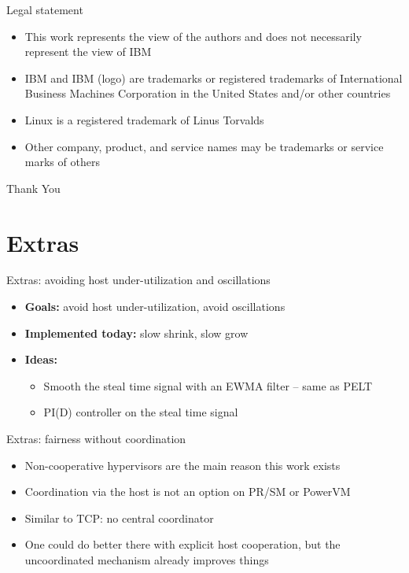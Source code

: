 \documentclass[xetex, table, 10pt,%
aspectratio=169%
]{beamer}
\begin{document}
\begin{frame}{Legal statement}
\begin{itemize}
  \item This work represents the view of the authors and does not
    necessarily represent the view of IBM
  \item IBM and IBM (logo) are trademarks or registered trademarks
    of International Business Machines Corporation in the United
    States and/or other countries
  \item Linux is a registered trademark of Linus Torvalds
  \item Other company, product, and service names may be trademarks
    or service marks of others
\end{itemize}
\end{frame}

\begin{frame}[plain]
\begin{center}
{\Huge Thank You}
\end{center}
\end{frame}

\section*{Extras}

\begin{frame}{Extras: avoiding host under-utilization and oscillations}
\begin{itemize}
  \item \textbf{Goals:} avoid host under-utilization, avoid
    oscillations
  \item \textbf{Implemented today:} slow shrink, slow grow
  \item \textbf{Ideas:}
  \begin{itemize}
    \item Smooth the steal time signal with an EWMA filter -- same
      as PELT
    \item PI(D) controller on the steal time signal
  \end{itemize}
\end{itemize}
\end{frame}

\begin{frame}{Extras: fairness without coordination}
\begin{itemize}
  \item Non-cooperative hypervisors are the main reason this work
    exists
  \item Coordination via the host is not an option on PR/SM or PowerVM
  \item Similar to TCP: no central coordinator
  \item One could do better there with explicit host cooperation, but
    the uncoordinated mechanism already improves things
\end{itemize}
\end{frame}
\end{document}
